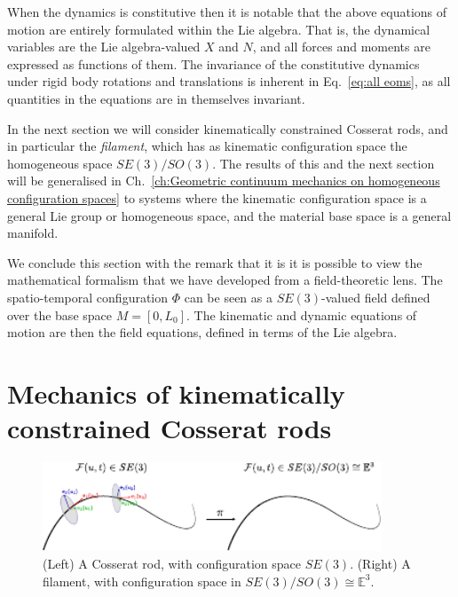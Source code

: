When the dynamics is constitutive then it is notable that the above equations of motion are entirely formulated within the Lie algebra. That is, the dynamical variables are the Lie algebra-valued $X$ and $N$, and all forces and moments are expressed as functions of them. The invariance of the constitutive dynamics under rigid body rotations and translations is inherent in Eq.~\ref{eq:all eoms}, as all quantities in the equations are in themselves invariant.

In the next section we will consider kinematically constrained Cosserat rods, and in particular the \textit{filament}, which has as kinematic configuration space the homogeneous space $SE(3)/SO(3)$. The results of this and the next section will be generalised in Ch.~\ref{ch:Geometric continuum mechanics on homogeneous configuration spaces} to systems where the kinematic configuration space is a general Lie group or homogeneous space, and the material base space is a general manifold.

We conclude this section with the remark that it is it is possible to view the mathematical formalism that we have developed from a field-theoretic lens. The spatio-temporal configuration $\Phi$ can be seen as a $SE(3)$-valued field defined over the base space $M = [0, L_0]$. The kinematic and dynamic equations of motion are then the field equations, defined in terms of the Lie algebra.


\section{Mechanics of kinematically constrained Cosserat rods} \label{sec:Mechanics of kinematically constrained Cosserat rods}

\begin{figure}[t]
\centering
        \includegraphics[width=0.9\textwidth]{figs_part2/sec7.5_kinematically_constrained_cosserat_rods/cosserat_rod_to_filament.pdf}
        \caption{(Left) A Cosserat rod, with configuration space $SE(3)$. (Right) A filament, with configuration space in $SE(3)/SO(3) \cong \mathbb{E}^3$.}
        \label{fig:cosserat rod and filament}
\end{figure}

